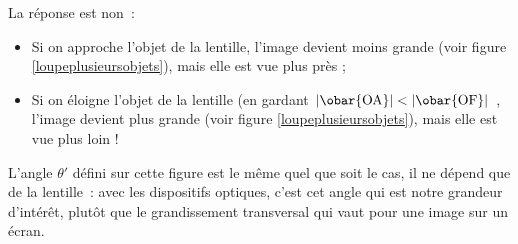 \documentclass[../../main/main.tex]{subfiles}
\begin{document}
\begin{minipage}[c]{0.45\linewidth}
	La réponse est non~:
	\begin{itemize}[label=$\diamond$, leftmargin=10pt]
		\item Si on approche l'objet de la lentille, l'image devient moins
		      grande (voir figure \ref{loupeplusieursobjets}), mais elle est vue
		      plus près ;
		\item Si on éloigne l'objet de la lentille (en gardant $|\obar{\rm OA}| <
			      |\obar{\rm OF}|$ , l'image devient plus grande (voir figure
		      \ref{loupeplusieursobjets}), mais elle est vue plus loin !
	\end{itemize}
	\medskip
	L'angle $\theta'$ défini sur cette figure est le même quel que soit le cas,
	il ne dépend que de la lentille~: avec les dispositifs optiques, c'est cet
	angle qui est notre grandeur d'intérêt, plutôt que le grandissement
	transversal qui vaut pour une image sur un écran.

	\bigskip

\end{minipage}
\hfill
\begin{minipage}[c]{0.45\linewidth}
	\begin{center}
		\label{loupeplusieursobjets}
	\end{center}
\end{minipage}
\end{document}
